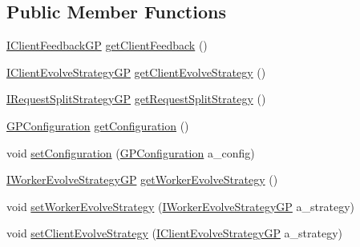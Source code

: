 \subsection*{Public Member Functions}
\begin{DoxyCompactItemize}
\item 
\hyperlink{interfaceorg_1_1jgap_1_1distr_1_1grid_1_1gp_1_1_i_client_feedback_g_p}{I\-Client\-Feedback\-G\-P} \hyperlink{interfaceorg_1_1jgap_1_1distr_1_1grid_1_1gp_1_1_i_grid_configuration_g_p_a0bd2b08a96eb520925952efccc7b6414}{get\-Client\-Feedback} ()
\item 
\hyperlink{interfaceorg_1_1jgap_1_1distr_1_1grid_1_1gp_1_1_i_client_evolve_strategy_g_p}{I\-Client\-Evolve\-Strategy\-G\-P} \hyperlink{interfaceorg_1_1jgap_1_1distr_1_1grid_1_1gp_1_1_i_grid_configuration_g_p_acee2d139c3a39f2b6bcad089d337894f}{get\-Client\-Evolve\-Strategy} ()
\item 
\hyperlink{interfaceorg_1_1jgap_1_1distr_1_1grid_1_1gp_1_1_i_request_split_strategy_g_p}{I\-Request\-Split\-Strategy\-G\-P} \hyperlink{interfaceorg_1_1jgap_1_1distr_1_1grid_1_1gp_1_1_i_grid_configuration_g_p_a9a5091ae8751e7d94c782d70511ed2b1}{get\-Request\-Split\-Strategy} ()
\item 
\hyperlink{classorg_1_1jgap_1_1gp_1_1impl_1_1_g_p_configuration}{G\-P\-Configuration} \hyperlink{interfaceorg_1_1jgap_1_1distr_1_1grid_1_1gp_1_1_i_grid_configuration_g_p_aec0e34abc2c1de18f8acc76ba88d217e}{get\-Configuration} ()
\item 
void \hyperlink{interfaceorg_1_1jgap_1_1distr_1_1grid_1_1gp_1_1_i_grid_configuration_g_p_a7cfa63f97297fdae6c4a04693bc37a47}{set\-Configuration} (\hyperlink{classorg_1_1jgap_1_1gp_1_1impl_1_1_g_p_configuration}{G\-P\-Configuration} a\-\_\-config)
\item 
\hyperlink{interfaceorg_1_1jgap_1_1distr_1_1grid_1_1gp_1_1_i_worker_evolve_strategy_g_p}{I\-Worker\-Evolve\-Strategy\-G\-P} \hyperlink{interfaceorg_1_1jgap_1_1distr_1_1grid_1_1gp_1_1_i_grid_configuration_g_p_a0050537a02a2c2a2bc9dd5e9fe5e3737}{get\-Worker\-Evolve\-Strategy} ()
\item 
void \hyperlink{interfaceorg_1_1jgap_1_1distr_1_1grid_1_1gp_1_1_i_grid_configuration_g_p_a498004c9affa82d62877cf4d35c078bc}{set\-Worker\-Evolve\-Strategy} (\hyperlink{interfaceorg_1_1jgap_1_1distr_1_1grid_1_1gp_1_1_i_worker_evolve_strategy_g_p}{I\-Worker\-Evolve\-Strategy\-G\-P} a\-\_\-strategy)
\item 
void \hyperlink{interfaceorg_1_1jgap_1_1distr_1_1grid_1_1gp_1_1_i_grid_configuration_g_p_a72979a59fc643e264efd69be939601e6}{set\-Client\-Evolve\-Strategy} (\hyperlink{interfaceorg_1_1jgap_1_1distr_1_1grid_1_1gp_1_1_i_client_evolve_strategy_g_p}{I\-Client\-Evolve\-Strategy\-G\-P} a\-\_\-strategy)

\end{DoxyCompactItemize}
